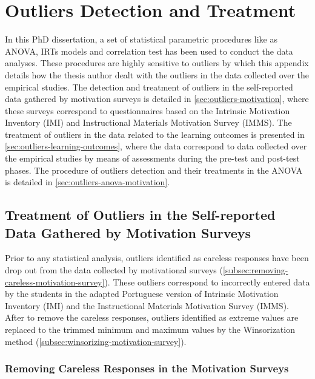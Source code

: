 
\chapter{Outliers Detection and Treatment}
\label{appendix:outliers}

In this PhD dissertation, a set of statistical parametric procedures like as ANOVA, IRTs models and correlation test has been used to conduct the data analyses. These procedures are highly sensitive to outliers by which this appendix details how the thesis author dealt with the outliers in the data collected over the empirical studies. The detection and treatment of outliers in the self-reported data gathered by motivation surveys is detailed in \autoref{sec:outliers-motivation}, where these surveys correspond to questionnaires based on the Intrinsic Motivation Inventory (IMI) and Instructional Materials Motivation Survey (IMMS). The treatment of outliers in the data related to the learning outcomes is presented in \autoref{sec:outliers-learning-outcomes}, where the data correspond to data collected over the empirical studies by means of assessments during the pre-test and post-test phases.
The procedure of outliers detection and their treatments in the ANOVA is detailed in \autoref{sec:outliers-anova-motivation}.


\section{Treatment of Outliers in the Self-reported Data Gathered by Motivation Surveys}
\label{sec:outliers-motivation}

Prior to any statistical analysis, outliers identified as careless responses have been drop out from the data collected by motivational surveys (\autoref{subsec:removing-careless-motivation-survey}). These outliers correspond to incorrectly entered data by the students in the adapted Portuguese version of Intrinsic Motivation Inventory (IMI) and the Instructional Materials Motivation Survey (IMMS). After to remove the careless responses, outliers identified as extreme values are replaced to the trimmed minimum and maximum values by the Winsorization method (\autoref{subsec:winsorizing-motivation-survey}).

\subsection{Removing Careless Responses in the Motivation Surveys}
\label{subsec:removing-careless-motivation-survey}

